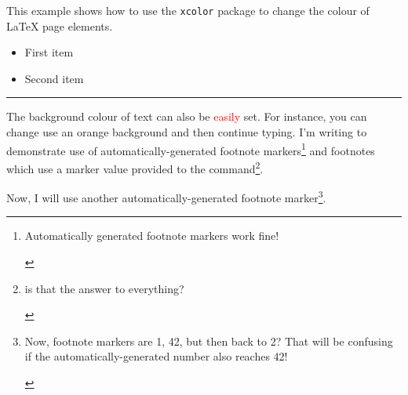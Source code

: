 \documentclass{article}
\begin{document}
This example shows how to use the \texttt{xcolor} package 
to change the colour of \LaTeX{} page elements.

\begin{itemize}
\color{ForestGreen}
\item First item
\item Second item
\end{itemize}

\noindent
{\color{RubineRed} \rule{\linewidth}{0.5mm}}

The background colour of text can also be \textcolor{red}{easily} set. For 
instance, you can change use an \colorbox{BurntOrange}{orange background} and then continue typing.
I'm writing to demonstrate use of automatically-generated footnote markers\footnote{\begin{footnotesize}Automatically generated footnote markers work fine!\end{footnotesize}} and footnotes which use a marker value provided to the command\footnote[42]{\begin{footnotesize}

is that the answer to everything?\end{footnotesize}}. 

Now, I will use another automatically-generated footnote marker\footnote{\begin{footnotesize}Now, footnote markers are 1, 42, but then back to 2? That will be confusing if the automatically-generated number also reaches 42!\end{footnotesize}}.
\end{document}
